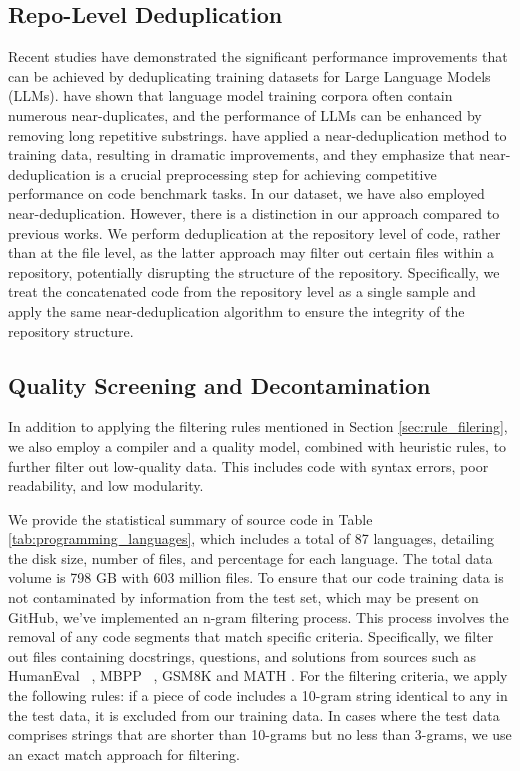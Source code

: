\subsection{Repo-Level Deduplication} Recent studies have demonstrated the significant performance improvements that can be achieved by deduplicating training datasets for Large Language Models (LLMs).  \cite{lee2022deduplicating} have shown that language model training corpora often contain numerous near-duplicates, and the performance of LLMs can be enhanced by removing long repetitive substrings. \cite{kocetkov2022stack} have applied a near-deduplication method to training data, resulting in dramatic improvements, and they emphasize that near-deduplication is a crucial preprocessing step for achieving competitive performance on code benchmark tasks. In our dataset, we have also employed near-deduplication. However, there is a distinction in our approach compared to previous works. We perform deduplication at the repository level of code, rather than at the file level, as the latter approach may filter out certain files within a repository, potentially disrupting the structure of the repository. Specifically, we treat the concatenated code from the repository level as a single sample and apply the same near-deduplication algorithm to ensure the integrity of the repository structure.

\subsection{Quality Screening and Decontamination}

In addition to applying the filtering rules mentioned in Section \ref{sec:rule_filering}, we also employ a compiler and a quality model, combined with heuristic rules, to further filter out low-quality data. This includes code with syntax errors, poor readability, and low modularity. 

We provide the statistical summary of source code in Table \ref{tab:programming_languages}, which includes a total of 87 languages, detailing the disk size, number of files, and percentage for each language. The total data volume is 798 GB with 603 million files. To ensure that our code training data is not contaminated by information from the test set, which may be present on GitHub, we've implemented an n-gram filtering process. This process involves the removal of any code segments that match specific criteria. Specifically, we filter out files containing docstrings, questions, and solutions from sources such as HumanEval ~\citep{chen2021evaluating}, MBPP ~\citep{austin2021program}, GSM8K \citep{gsm8k} and MATH \citep{hendrycks2021measuring}. For the filtering criteria, we apply the following rules: if a piece of code includes a 10-gram string identical to any in the test data, it is excluded from our training data. In cases where the test data comprises strings that are shorter than 10-grams but no less than 3-grams, we use an exact match approach for filtering.

